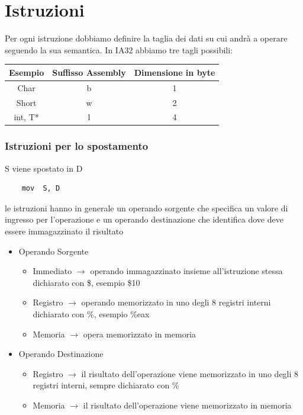 \section{Istruzioni}
Per ogni istruzione dobbiamo definire la taglia dei dati su cui andrà a operare seguendo la sua semantica. In IA32 abbiamo tre tagli possibili:

\begin{table}[H]
    \centering
    \begin{tabular}{|c|c|c|}
    \hline
         Esempio & Suffisso Assembly & Dimensione in byte\\
         \hline
         Char & b & 1 \\
         Short & w & 2 \\
         int, T* & l & 4 \\
         \hline
    \end{tabular}
\end{table}
\noindent



\subsubsection{Istruzioni per lo spostamento}
S viene spostato in D

\begin{verbatim}
    mov  S, D
\end{verbatim}

\noindent le istruzioni hanno in generale un operando sorgente che specifica un valore di ingresso per l'operazione e un operando destinazione che identifica dove deve essere immagazzinato il risultato

\begin{itemize}[label=--]
    \item Operando Sorgente
    \begin{itemize}
    \item Immediato $\rightarrow$ operando immagazzinato insieme all'istruzione stessa dichiarato con \$, esempio \$10
    \item Registro $\rightarrow$ operando memorizzato in  uno degli 8 registri interni dichiarato con \%, esempio \%eax
    \item Memoria $\rightarrow$ opera memorizzato in memoria
    \end{itemize}
    \item Operando Destinazione
    \begin{itemize}
        \item Registro $\rightarrow$ il risultato dell'operazione viene memorizzato in uno degli 8 registri interni, sempre dichiarato con \%
        \item Memoria $\rightarrow$ il risultato dell'operazione viene memorizzato in memoria
    \end{itemize}
\end{itemize}

